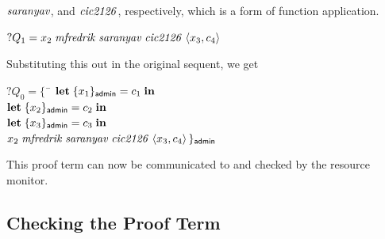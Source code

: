 \documentclass[11pt]{article}
\begin{document}
$\mathit{saranyav}$, and $\mathit{cic2126}$, respectively, which is a form of function
application.
\begin{tabbing}
  \qquad ${?}Q_1 = x_2\; \mathit{mfredrik}\; \mathit{saranyav}\; \mathit{cic2126}\; \langle x_3, c_4\rangle$
\end{tabbing}
Substituting this out in the original sequent, we get
\begin{tabbing}
  \qquad ${?}Q_0 = \{\,$ \= $\mathbf{let}\; \{x_1\}_{\mathsf{admin}} = c_1\; \mathbf{in}$ \\
  \> $\mathbf{let}\; \{x_2\}_{\mathsf{admin}} = c_2\; \mathbf{in}$ \\
  \> $\mathbf{let}\; \{x_3\}_{\mathsf{admin}} = c_3\; \mathbf{in}$ \\
  \> $x_2\; \mathit{mfredrik}\; \mathit{saranyav}\; \mathit{cic2126}\; \langle x_3, c_4\rangle\,\}_{\mathsf{admin}}$
\end{tabbing}
This proof term can now be communicated to and checked by the resource monitor.

\subsection{Checking the Proof Term}
\end{document}
